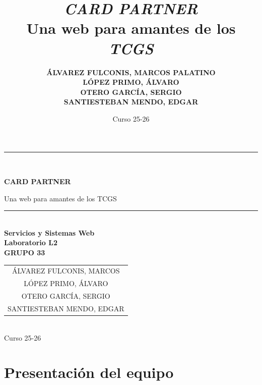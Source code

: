 \documentclass[10pt]{article}
\title{\textit{CARD PARTNER}\\ Una web para amantes de los \textit{TCGS}}
\author{
	\textbf{\small ÁLVAREZ FULCONIS, MARCOS PALATINO}\\
	\textbf{\small LÓPEZ PRIMO, ÁLVARO}\\
	\textbf{\small OTERO GARCÍA, SERGIO}\\
	\textbf{\small SANTIESTEBAN MENDO, EDGAR}
}
\date{Curso 25-26}
\begin{document}
	
	\begin{titlepage}
		\centering
		\rule{\linewidth}{0.2mm}\\[0.4cm]
		{\huge\bfseries CARD PARTNER\par}
		{\large Una web para amantes de los TCGS\par}
		\rule{\linewidth}{0.2mm}\\[1.5cm]
		{\Large\bfseries Servicios y Sistemas Web}\\[0.3cm]
		{\large\bfseries Laboratorio L2 \\ GRUPO 33}\\[1cm]
		{\Large \begin{tabular}{c} ÁLVAREZ FULCONIS, MARCOS \\ LÓPEZ PRIMO, ÁLVARO \\ OTERO GARCÍA, SERGIO \\ SANTIESTEBAN MENDO, EDGAR \end{tabular}}\\[1.5cm]
		{\Large Curso 25-26}
	\end{titlepage}
	
	\tableofcontents \newpage
	
	\setcounter{page}{1}
	
	\section{Presentación del equipo}	
\end{document}
